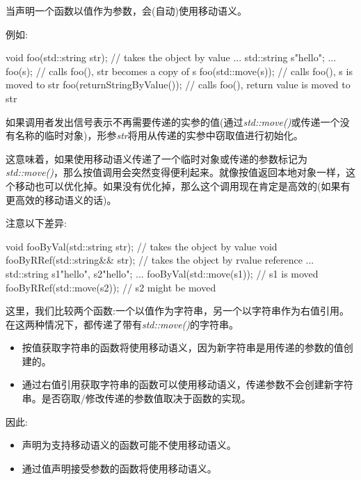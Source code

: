 当声明一个函数以值作为参数，会(自动)使用移动语义。\par

例如:\par

\begin{codebox}[cpp]
void foo(std::string str); // takes the object by value
...
std::string s{"hello"};
...
foo(s); // calls foo(), str becomes a copy of s
foo(std::move(s)); // calls foo(), s is moved to str
foo(returnStringByValue()); // calls foo(), return value is moved to str
\end{codebox}

如果调用者发出信号表示不再需要传递的实参的值(通过\textit{std::move()}或传递一个没有名称的临时对象)，形参\textit{str}将用从传递的实参中窃取值进行初始化。\par

这意味着，如果使用移动语义传递了一个临时对象或传递的参数标记为\textit{std::move()}，那么按值调用会突然变得便利起来。就像按值返回本地对象一样，这个移动也可以优化掉。如果没有优化掉，那么这个调用现在肯定是高效的(如果有更高效的移动语义的话)。\par

注意以下差异:\par

\begin{codebox}[cpp]
void fooByVal(std::string str); // takes the object by value
void fooByRRef(std::string&& str); // takes the object by rvalue reference
...
std::string s1{"hello"}, s2{"hello"};
...
fooByVal(std::move(s1)); // s1 is moved
fooByRRef(std::move(s2)); // s2 might be moved
\end{codebox}

这里，我们比较两个函数:一个以值作为字符串，另一个以字符串作为右值引用。在这两种情况下，都传递了带有\textit{std::move()}的字符串。\par

\begin{itemize}
  \item 按值获取字符串的函数将使用移动语义，因为新字符串是用传递的参数的值创建的。
  \item 通过右值引用获取字符串的函数可以使用移动语义，传递参数不会创建新字符串。是否窃取/修改传递的参数值取决于函数的实现。
\end{itemize}

因此:\par

\begin{itemize}
  \item 声明为支持移动语义的函数可能不使用移动语义。
  \item 通过值声明接受参数的函数将使用移动语义。
\end{itemize}

